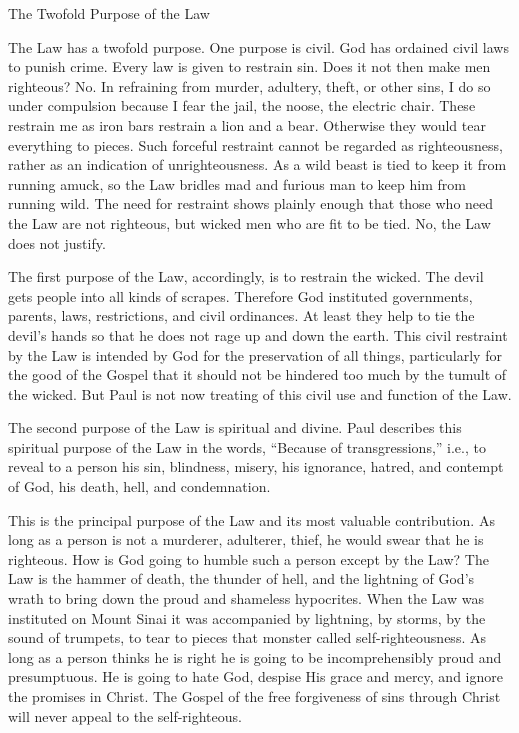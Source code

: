 The Twofold Purpose of the Law

The Law has a twofold purpose. One purpose is civil. God has ordained civil laws to punish crime. Every law is given to restrain sin. Does it not then make men righteous? No. In refraining from murder, adultery, theft, or other sins, I do so under compulsion because I fear the jail, the noose, the electric chair. These restrain me as iron bars restrain a lion and a bear. Otherwise they would tear everything to pieces. Such forceful restraint cannot be regarded as righteousness, rather as an indication of unrighteousness. As a wild beast is tied to keep it from running amuck, so the Law bridles mad and furious man to keep him from running wild. The need for restraint shows plainly enough that those who need the Law are not righteous, but wicked men who are fit to be tied. No, the Law does not justify.

The first purpose of the Law, accordingly, is to restrain the wicked. The devil gets people into all kinds of scrapes. Therefore God instituted governments, parents, laws, restrictions, and civil ordinances. At least they help to tie the devil’s hands so that he does not rage up and down the earth. This civil restraint by the Law is intended by God for the preservation of all things, particularly for the good of the Gospel that it should not be hindered too much by the tumult of the wicked. But Paul is not now treating of this civil use and function of the Law.

The second purpose of the Law is spiritual and divine. Paul describes this spiritual purpose of the Law in the words, “Because of transgressions,” i.e., to reveal to a person his sin, blindness, misery, his ignorance, hatred, and contempt of God, his death, hell, and condemnation.

This is the principal purpose of the Law and its most valuable contribution. As long as a person is not a murderer, adulterer, thief, he would swear that he is righteous. How is God going to humble such a person except by the Law? The Law is the hammer of death, the thunder of hell, and the lightning of God’s wrath to bring down the proud and shameless hypocrites. When the Law was instituted on Mount Sinai it was accompanied by lightning, by storms, by the sound of trumpets, to tear to pieces that monster called self-righteousness. As long as a person thinks he is right he is going to be incomprehensibly proud and presumptuous. He is going to hate God, despise His grace and mercy, and ignore the promises in Christ. The Gospel of the free forgiveness of sins through Christ will never appeal to the self-righteous.

